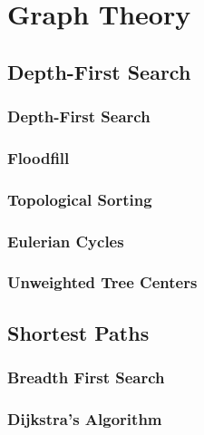 \chapter{Graph Theory}

\section{Depth-First Search}
\setcounter{section}{1}
\setcounter{subsection}{0}
\subsection{Depth-First Search}

\subsection{Floodfill}

\subsection{Topological Sorting}

\subsection{Eulerian Cycles}

\subsection{Unweighted Tree Centers}


\section{Shortest Paths}
\setcounter{section}{2}
\setcounter{subsection}{0}
\subsection{Breadth First Search}

\subsection{Dijkstra's Algorithm}


